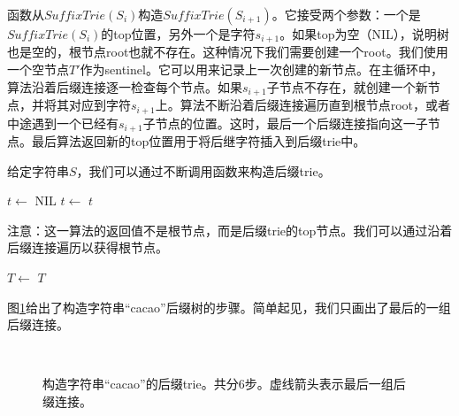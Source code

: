 \documentclass[UTF8]{article}
\begin{document}
函数从$SuffixTrie(S_i)$构造$SuffixTrie(S_{i+1})$。它接受两个参数：一个是$SuffixTrie(S_i)$的top位置，另外一个是字符$s_{i+1}$。如果top为空（NIL），说明树也是空的，根节点root也就不存在。这种情况下我们需要创建一个root。我们使用一个空节点$T'$作为sentinel。它可以用来记录上一次创建的新节点。在主循环中，算法沿着后缀连接逐一检查每个节点。如果$s_{i+1}$子节点不存在，就创建一个新节点，并将其对应到字符$s_{i+1}$上。算法不断沿着后缀连接遍历直到根节点root，或者中途遇到一个已经有$s_{i+1}$子节点的位置。这时，最后一个后缀连接指向这一子节点。最后算法返回新的top位置用于将后继字符插入到后缀trie中。

给定字符串$S$，我们可以通过不断调用函数来构造后缀trie。

\begin{algorithmic}[1]
  \State $t \gets$ NIL
    \State $t \gets$ 
  \EndFor
  \State \Return $t$
\EndFunction
\end{algorithmic}

注意：这一算法的返回值不是根节点，而是后缀trie的top节点。我们可以通过沿着后缀连接遍历以获得根节点。

\begin{algorithmic}[1]
    \State $T \gets$ 
  \EndWhile
  \State \Return $T$
\EndFunction
\end{algorithmic}

图\ref{fig:cons-strie-cacao}给出了构造字符串“cacao”后缀树的步骤。简单起见，我们只画出了最后的一组后缀连接。

\begin{figure}[htbp]
  \centering
   \\
  \caption{构造字符串“cacao”的后缀trie。共分6步。虚线箭头表示最后一组后缀连接。}
  \label{fig:cons-strie-cacao}
\end{figure}
\end{document}
